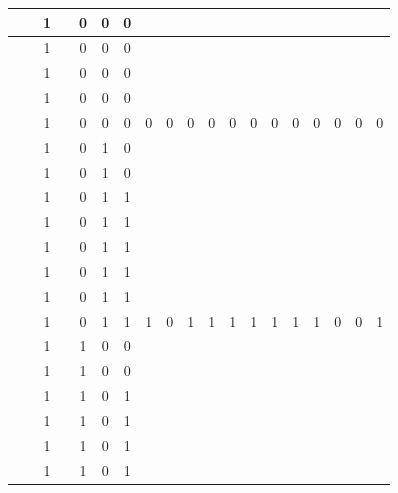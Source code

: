 \begin{table}[!tb]
\begin{tabular}{|c|c|c|c|c|c|c|c|c|c|c|c|c|c|c|c|c|c|c|}
        \rowcolor{yellow!40}  &  & 1 &  & 0 & 0 & 0 &  &  &  &  &  &  &  &  &  &  &  &  \\ \hline
        \rowcolor{yellow!40}  &  & 1 &  & 0 & 0 & 0 &  &  &  &  &  &  &  &  &  &  &  &  \\ \hline
        \rowcolor{yellow!40}  &  & 1 &  & 0 & 0 & 0 &  &  &  &  &  &  &  &  &  &  &  &  \\ \hline
        \rowcolor{yellow!40}  &  & 1 &  & 0 & 0 & 0 &  &  &  &  &  &  &  &  &  &  &  &  \\ \hline
        \rowcolor{yellow!40}  &  & 1 &  & 0 & 0 & 0 & 0 & 0 & 0 & 0 & 0 & 0 & 0 & 0 & 0 & 0 & 0 & 0 \\ \hline
        \rowcolor{gray!40}  &  & 1 &  & 0 & 1 & 0 &  &  &  &  &  &  &  &  &  &  &  &  \\ \hline
        \rowcolor{gray!40}  &  & 1 &  & 0 & 1 & 0 &  &  &  &  &  &  &  &  &  &  &  &  \\ \hline
        \rowcolor{gray!40}  &  & 1 &  & 0 & 1 & 1 &  &  &  &  &  &  &  &  &  &  &  &  \\ \hline
        \rowcolor{gray!40}  &  & 1 &  & 0 & 1 & 1 &  &  &  &  &  &  &  &  &  &  &  &  \\ \hline
        \rowcolor{gray!40}  &  & 1 &  & 0 & 1 & 1 &  &  &  &  &  &  &  &  &  &  &  &  \\ \hline
        \rowcolor{gray!40}  &  & 1 &  & 0 & 1 & 1 &  &  &  &  &  &  &  &  &  &  &  &  \\ \hline
        \rowcolor{gray!40}  &  & 1 &  & 0 & 1 & 1 &  &  &  &  &  &  &  &  &  &  &  &  \\ \hline
        \rowcolor{gray!40}  &  & 1 &  & 0 & 1 & 1 & 1 & 0 & 1 & 1 & 1 & 1 & 1 & 1 & 1 & 0 & 0 & 1 \\ \hline
        \rowcolor{blue!40}  &  & 1 &  & 1 & 0 & 0 &  &  &  &  &  &  &  &  &  &  &  &  \\ \hline
        \rowcolor{blue!40}  &  & 1 &  & 1 & 0 & 0 &  &  &  &  &  &  &  &  &  &  &  &  \\ \hline
        \rowcolor{blue!40}  &  & 1 &  & 1 & 0 & 1 &  &  &  &  &  &  &  &  &  &  &  &  \\ \hline
        \rowcolor{blue!40}  &  & 1 &  & 1 & 0 & 1 &  &  &  &  &  &  &  &  &  &  &  &  \\ \hline
        \rowcolor{blue!40}  &  & 1 &  & 1 & 0 & 1 &  &  &  &  &  &  &  &  &  &  &  &  \\ \hline
        \rowcolor{blue!40}  &  & 1 &  & 1 & 0 & 1 &  &  &  &  &  &  &  &  &  &  &  &  \\ \hline

\end{tabular}
\end{table}
